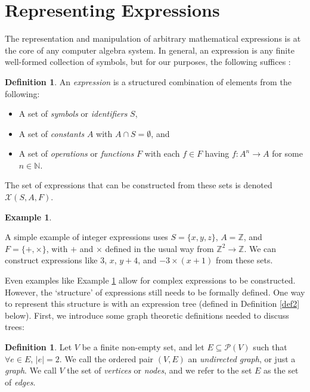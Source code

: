 \documentclass{article}
\theoremstyle{definition}
\newtheorem{defin}[thm]{Definition}
\newtheorem{exa}[thm]{Example}
\begin{document}
\newpage

\tableofcontents

\newpage

\section{Representing Expressions}

The representation and manipulation of arbitrary mathematical expressions is at the core of any computer algebra system. In general, an expression is any finite well-formed collection of symbols, but for our purposes, the following suffices \cite{casc1}:

\begin{defin} \label{def1}
    An \emph{expression} is a structured combination of elements from the following:
    \begin{itemize}
        \item A set of \emph{symbols} or \emph{identifiers} $S$,
        \item A set of \emph{constants} $A$ with $A \cap S = \emptyset$, and
        \item A set of \emph{operations} or \emph{functions} $F$ with each $f \in F$ having $f: A^n \to A$ for some $n \in \mathbb{N}$.
    \end{itemize}
    
    The set of expressions that can be constructed from these sets is denoted $\mathcal{X}(S, A, F)$.
\end{defin}

\begin{exa} \label{exa0}

A simple example of integer expressions uses $S = \{x, y, z\}$, $A = \mathbb{Z}$, and $F = \{+, \times\}$, with $+$ and $\times$ defined in the usual way from $\mathbb{Z}^2 \to \mathbb{Z}$. We can construct expressions like $3$, $x$, $y + 4$, and $-3 \times (x + 1)$ from these sets.



\end{exa}

Even examples like Example \ref{exa0} allow for complex expressions to be constructed. However, the `structure' of expressions still needs to be formally defined. One way to represent this structure is with an expression tree (defined in Definition \ref{def2} below). First, we introduce some graph theoretic definitions needed to discuss trees:

\begin{defin}
Let $V$ be a finite non-empty set, and let $E \subseteq \mathcal{P}(V)$ such that $\forall e \in E$, $|e| = 2$. We call the ordered pair $(V,E)$ an \emph{undirected graph}, or just a \emph{graph}. We call $V$ the set of \emph{vertices} or \emph{nodes}, and we refer to the set $E$ as the set of \emph{edges}.
\end{defin}
\end{document}
